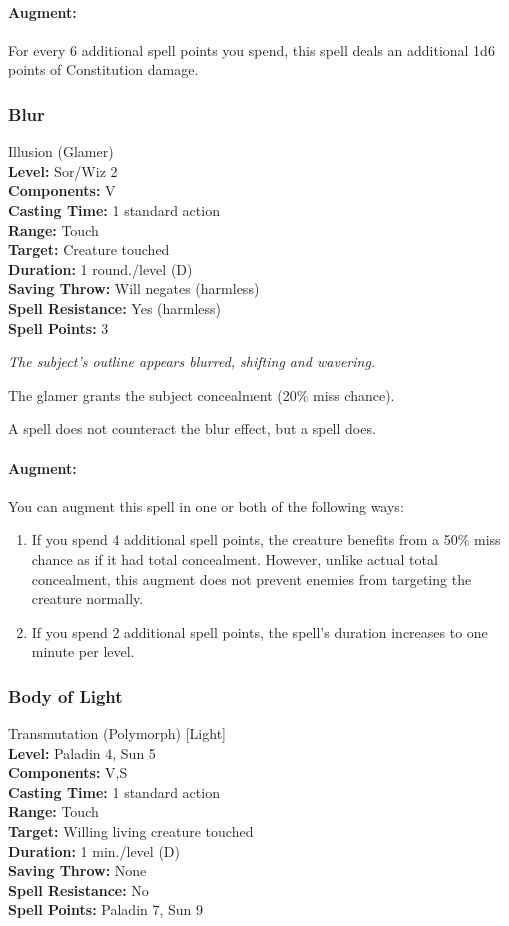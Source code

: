 \paragraph{Augment:} For every 6 additional spell points you spend, this spell deals an additional 1d6 points of Constitution damage.
\subsubsection{Blur}
\label{Spell:Blur}
Illusion (Glamer)
\\ \textbf{Level:} Sor/Wiz 2
\\ \textbf{Components:} V
\\ \textbf{Casting Time:} 1 standard action
\\ \textbf{Range:} Touch
\\ \textbf{Target:} Creature touched
\\ \textbf{Duration:} 1 round./level (D)
\\ \textbf{Saving Throw:} Will negates (harmless)
\\ \textbf{Spell Resistance:} Yes (harmless)
\\ \textbf{Spell Points:} 3

\emph{The subject's outline appears blurred, shifting and wavering.}

The glamer grants the subject concealment (20\% miss chance).

A  spell does not counteract the blur effect, but a  spell does.

\paragraph{Augment:} You can augment this spell in one or both of the following ways:
\begin{enumerate}
 \item If you spend 4 additional spell points, the creature benefits from a 50\% miss chance as if it had total concealment. 
However, unlike actual total concealment, this augment does not prevent enemies from targeting the creature normally.
 \item If you spend 2 additional spell points, the spell's duration increases to one minute per level.
\end{enumerate}
\subsubsection{Body of Light}
\label{Spell:BodyOfLight}
Transmutation (Polymorph) [Light]
\\ \textbf{Level:} Paladin 4, Sun 5
\\ \textbf{Components:} V,S
\\ \textbf{Casting Time:} 1 standard action
\\ \textbf{Range:} Touch
\\ \textbf{Target:} Willing living creature touched
\\ \textbf{Duration:} 1 min./level (D)
\\ \textbf{Saving Throw:} None
\\ \textbf{Spell Resistance:} No
\\ \textbf{Spell Points:} Paladin 7, Sun 9

